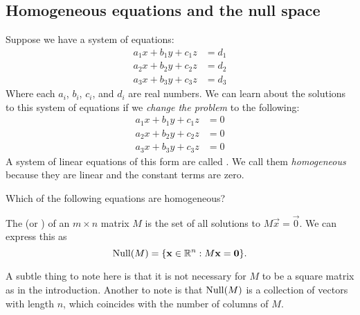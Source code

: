 \documentclass{ximera}
\begin{document}
\subsection{Homogeneous equations and the null space}
Suppose we have a system of equations:
\begin{align*}
  a_1 x + b_1 y + c_1 z & = d_1 \\
  a_2 x + b_2 y + c_2 z & = d_2 \\
  a_3 x + b_3 y + c_3 z & = d_3
\end{align*}
Where each $a_i$, $b_i$, $c_i$, and $d_i$ are real numbers. We can
learn about the solutions to this system of equations if we
\textit{change the problem} to the following:
\begin{align*}
  a_1 x + b_1 y + c_1 z & = 0 \\
  a_2 x + b_2 y + c_2 z & = 0 \\
  a_3 x + b_3 y + c_3 z & = 0
\end{align*}
A system of linear equations of this form are called . We call
them \textit{homogeneous} because they are linear and the constant terms are
zero.

\begin{question}
  Which of the following equations are homogeneous?
  \begin{selectAll}
  \end{selectAll}
\end{question}

\begin{definition}
  The  (or ) of an $m \times n$ matrix $M$ is
  the set of all solutions to $M\vec{x} = \vec{0}$. We can express
  this as
  \[
    \operatorname{Null}(M) = \{ \mathbf{x}\in\mathbb{R}^n: M\mathbf{x} = \mathbf{0}\}.
  \]
\end{definition}

\begin{remark}
  A subtle thing to note here is that it is not necessary for $M$ to be
  a square matrix as in the introduction. Another to note is that
  $\operatorname{Null}(M)$ is a collection of vectors with length $n$, which coincides
  with the number of columns of $M$.
\end{remark}
\end{document}
